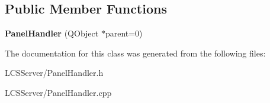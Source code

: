 \subsection*{Public Member Functions}
\begin{DoxyCompactItemize}
\item 
\mbox{\label{class_panel_handler_adb89080d8cfe5d1242e9b94375e347fd}} 
{\bfseries Panel\+Handler} (Q\+Object $\ast$parent=0)
\end{DoxyCompactItemize}


The documentation for this class was generated from the following files\+:\begin{DoxyCompactItemize}
\item 
L\+C\+S\+Server/Panel\+Handler.\+h\item 
L\+C\+S\+Server/Panel\+Handler.\+cpp\end{DoxyCompactItemize}
